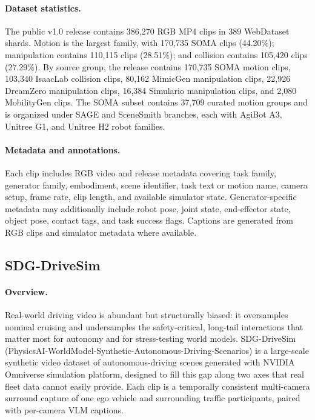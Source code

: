 \paragraph{Dataset statistics.}
\label{appendix:sdg_robotsim_dataset_statistics}
The public v1.0 release contains 386{,}270 RGB MP4 clips in 389 WebDataset shards. Motion is the largest family, with 170{,}735 SOMA clips (44.20\%); manipulation contains 110{,}115 clips (28.51\%); and collision contains 105{,}420 clips (27.29\%). By source group, the release contains 170{,}735 SOMA motion clips, 103{,}340 IsaacLab collision clips, 80{,}162 MimicGen manipulation clips, 22{,}926 DreamZero manipulation clips, 16{,}384 Simulario manipulation clips, and 2{,}080 MobilityGen clips. The SOMA subset contains 37{,}709 curated motion groups and is organized under SAGE and SceneSmith branches, each with AgiBot A3, Unitree G1, and Unitree H2 robot families.

\paragraph{Metadata and annotations.}
\label{appendix:sdg_robotsim_metadata_annotations}
Each clip includes RGB video and release metadata covering task family, generator family, embodiment, scene identifier, task text or motion name, camera setup, frame rate, clip length, and available simulator state. Generator-specific metadata may additionally include robot pose, joint state, end-effector state, object pose, contact tags, and task success flags. Captions are generated from RGB clips and simulator metadata where available.

\subsection{SDG-DriveSim}
\label{appendix:sdg_drivesim}

\paragraph{Overview.}
\label{appendix:sdg_drivesim_overview}
Real-world driving video is abundant but structurally biased: it oversamples nominal cruising and undersamples the safety-critical, long-tail interactions that matter most for autonomy and for stress-testing world models. SDG-DriveSim (PhysicsAI-WorldModel-Synthetic-Autonomous-Driving-Scenarios) is a large-scale synthetic video dataset of autonomous-driving scenes generated with NVIDIA Omniverse simulation platform, designed to fill this gap along two axes that real fleet data cannot easily provide. Each clip is a temporally consistent multi-camera surround capture of one ego vehicle and surrounding traffic participants, paired with per-camera VLM captions.

